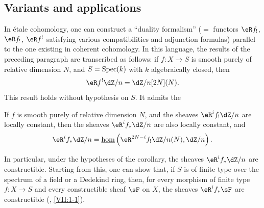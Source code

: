 \subsection{Variants and applications}\label{I:6-4}

In \'etale cohomology, one can construct a ``duality formalism''
($=$ functors $\eR f_!$, $\eR f_!$, $\eR f^!$ satisfying various
compatibilities and adjunction formulas) parallel to the one existing in
coherent cohomology. In this language, the results of the preceding
paragraph are transcribed as follows: if $f:X\to S$ is smooth purely of
relative dimension $N$, and $S=\operatorname{Spec}(k)$ with $k$ algebraically closed,
then
\[
  \eR f^! \dZ/n = \dZ/n [2N](N) \text{.}
\]
This result holds without hypothesis on $S$. It admits the 





\begin{corollary}\label{I:6-4-1}
If $f$ is smooth purely of relative dimension $N$, and the sheaves
$\eR^i f_! \dZ/n$ are locally constant, then the sheaves
$\eR^i f_* \dZ/n$ are also locally constant, and
\[
  \eR^i f_* \dZ/n = \const\hom\left(\eR^{2 N-i} f_! \dZ/n(N),\dZ/n\right)\text{.}
\]
\end{corollary}

In particular, under the hypotheses of the corollary, the sheaves
$\eR^i f_* \dZ/n$ are constructible. Starting from this, one can show that, if
$S$ is of finite type over the spectrum of a field or a Dedekind ring,
then, for every morphism of finite type $f:X\to S$ and every constructible
sheaf $\sF$ on $X$, the sheaves $\eR^i f_* \sF$ are constructible
(, \ref{VII:1-1}). 
